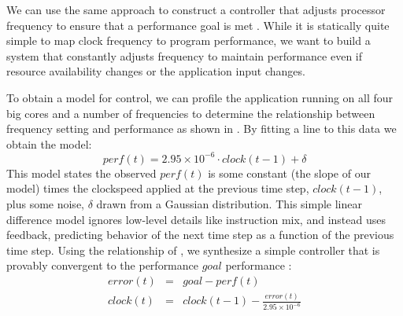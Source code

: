 We can use the same approach to construct a controller that adjusts
processor frequency to ensure that a performance goal is met
\cite{lefurgy}.  While it is statically quite simple to map clock
frequency to program performance, we want to build a system that
constantly adjusts frequency to maintain performance even if resource
availability changes or the application input changes. 

To obtain a model for control, we can profile the application running
on all four big cores and a number of frequencies to determine the
relationship between frequency setting and performance as shown in
.  By fitting a line to this data we obtain
the model:
\begin{equation}
  perf(t) = 2.95 \times 10^{-6} \cdot clock(t-1) + \delta \label{eqn:clock}
\end{equation}
This model states the observed $perf(t)$ is some constant (the slope
of our model) times the clockspeed applied at the previous time step,
$clock(t-1)$, plus some noise, $\delta$ drawn from a Gaussian
distribution.  This simple linear difference model ignores low-level
details like instruction mix, and instead uses feedback, predicting
behavior of the next time step as a function of the previous time
step.  Using the relationship of , we synthesize a
simple controller that is provably convergent to the performance
$goal$ performance \cite{ICSE2014}:
\begin{eqnarray}
  error(t) &=& goal - perf(t) \label{eqn:clock-error} \\
  clock(t) &=& clock(t-1) - \frac{error(t)}{ 2.95 \times 10^{-6}}
  \label{eqn:clock-control}
\end{eqnarray}

\begin{figure}
  \subfloat[]
  {
    
    \label{fig:lavamd_control}
  }
 \label{fig:freq-control}
\end{figure}


